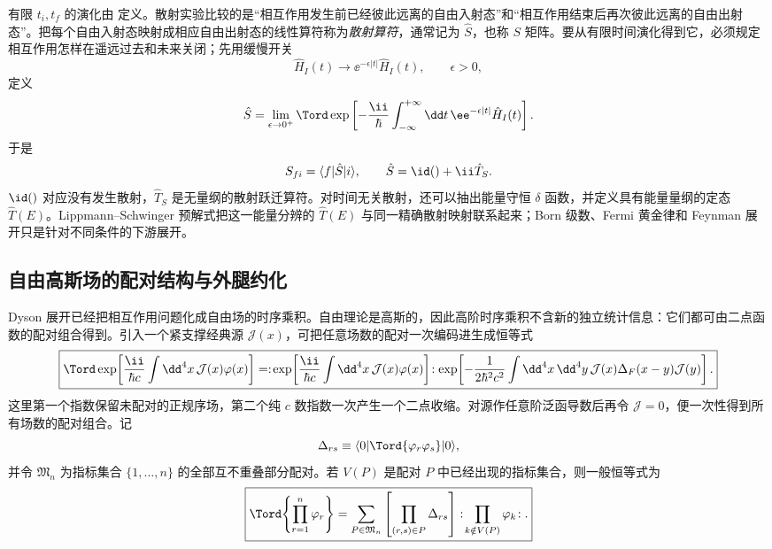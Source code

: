有限 $t_i,t_f$ 的演化由  定义。散射实验比较的是“相互作用发生前已经彼此远离的自由入射态”和“相互作用结束后再次彼此远离的自由出射态”。把每个自由入射态映射成相应自由出射态的线性算符称为\emph{散射算符}，通常记为 $\hat S$，也称 $S$ 矩阵。要从有限时间演化得到它，必须规定相互作用怎样在遥远过去和未来关闭；先用缓慢开关
\begin{equation*}
 \hat H_I(t)\longrightarrow \ee^{-\epsilon|t|}\hat H_I(t),
 \qquad \epsilon>0,
\end{equation*}
定义
\begin{equation}
 \hat S
 =\lim_{\epsilon\to0^+}
 \Tord\exp\left[-\frac{\ii}{\hbar}
 \int_{-\infty}^{+\infty}\dd t\,
 \ee^{-\epsilon|t|}\hat H_I(t)\right].
 \label{eq:S-adiabatic-r3}
\end{equation}
于是
\begin{equation}
 S_{fi}=\langle f|\hat S|i\rangle,
 \qquad
 \hat S=\id()+\ii\hat T_S.
 \label{eq:S-T-def-r3}
\end{equation}
$\id()$ 对应没有发生散射，$\hat T_S$ 是无量纲的散射跃迁算符。对时间无关散射，还可以抽出能量守恒 $\delta$ 函数，并定义具有能量量纲的定态 $\hat T(E)$。Lippmann--Schwinger 预解式把这一能量分辨的 $\hat T(E)$ 与同一精确散射映射联系起来；Born 级数、Fermi 黄金律和 Feynman 展开只是针对不同条件的下游展开。



\subsection{自由高斯场的配对结构与外腿约化}

Dyson 展开已经把相互作用问题化成自由场的时序乘积。自由理论是高斯的，因此高阶时序乘积不含新的独立统计信息：它们都可由二点函数的配对组合得到。引入一个紧支撑经典源 $\mathcal J(x)$，可把任意场数的配对一次编码进生成恒等式
\begin{equation}
\boxed{
 \Tord\exp\!\left[\frac{\ii}{\hbar c}\int\dd^4 x\,\mathcal J(x)\varphi(x)\right]
 =:\!\exp\!\left[\frac{\ii}{\hbar c}\int\dd^4 x\,\mathcal J(x)\varphi(x)\right]\!:
 \exp\!\left[-\frac{1}{2\hbar^2c^2}\int\dd^4 x\,\dd^4 y\,
 \mathcal J(x)\Delta_F(x-y)\mathcal J(y)\right].}
\label{eq:wick-generating-identity-dp74}
\end{equation}
这里第一个指数保留未配对的正规序场，第二个纯 $c$ 数指数一次产生一个二点收缩。对源作任意阶泛函导数后再令 $\mathcal J=0$，便一次性得到所有场数的配对组合。记
\[
\Delta_{rs}\equiv
\langle0|\Tord\{\varphi_r\varphi_s\}|0\rangle,
\]
并令 $\mathfrak M_n$ 为指标集合 $\{1,\ldots,n\}$ 的全部互不重叠部分配对。若 $V(P)$ 是配对 $P$ 中已经出现的指标集合，则一般恒等式为
\begin{equation}
\boxed{
\Tord\!\left\{\prod_{r=1}^{n}\varphi_r\right\}
=\sum_{P\in\mathfrak M_n}
\left[\prod_{(r,s)\in P}\Delta_{rs}\right]
:\!\prod_{k\notin V(P)}\varphi_k\!: .}
\label{eq:wick-general-r3}
\end{equation}

